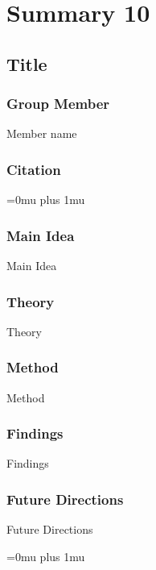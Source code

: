 \section{Summary 10}

\noindent
\subsection{Title}

\subsubsection{Group Member}

\noindent
Member name

\noindent
\subsubsection{Citation}

\Urlmuskip=0mu plus 1mu\relax

\subsubsection{Main Idea}

\noindent
Main Idea

\subsubsection{Theory}

\noindent
Theory

\subsubsection{Method}

\noindent
Method

\subsubsection{Findings}

\noindent
Findings

\subsubsection{Future Directions}

\noindent
Future Directions 

\Urlmuskip=0mu plus 1mu\relax

\pagebreak
